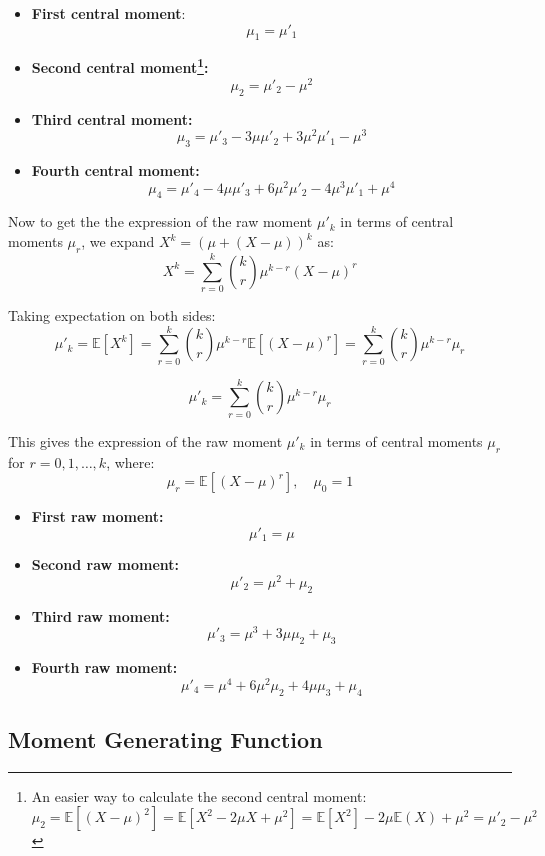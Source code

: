 \documentclass[twoside]{book}
\begin{document}
\begin{itemize}
\item \textbf{First central moment}:
$$\mu_1 = \mu'_1$$
  \item \textbf{Second central moment\footnote{An easier way to calculate the second central moment: \[
  \mu_2 = \mathbb{E}[(X - \mu)^2] 
  = \mathbb{E}[X^2 - 2\mu X + \mu^2]
  = \mathbb{E}[X^2] - 2\mu \mathbb{E}(X) + \mu^2
  = \mu'_2 - \mu^2
  \]}:}
  \[
  \mu_2 = \mu'_2 - \mu^2
  \]
  

  \item \textbf{Third central moment:}
  \[
  \mu_3 = \mu'_3 - 3\mu \mu'_2 + 3\mu^2 \mu'_1 - \mu^3
  \]

  \item \textbf{Fourth central moment:}
  \[
  \mu_4 = \mu'_4 - 4\mu \mu'_3 + 6\mu^2 \mu'_2 - 4\mu^3 \mu'_1 + \mu^4
  \]
\end{itemize}


Now to get the the expression of the raw moment \(\mu'_k\) in terms of central moments \(\mu_r\), we expand \(X^k = (\mu + (X - \mu))^k\) as:
\[
X^k = \sum_{r=0}^{k} \binom{k}{r} \mu^{k - r} (X - \mu)^r
\]

Taking expectation on both sides:
\[
\mu'_k = \mathbb{E}[X^k] = \sum_{r=0}^{k} \binom{k}{r} \mu^{k - r} \mathbb{E}[(X - \mu)^r]
= \sum_{r=0}^{k} \binom{k}{r} \mu^{k - r} \mu_r
\]
\begin{textbox}
    \[
\mu'_k = \sum_{r=0}^{k} \binom{k}{r} \mu^{k - r} \mu_r
\]
\end{textbox}

This gives the expression of the raw moment \(\mu'_k\) in terms of central moments \(\mu_r\) for \(r = 0, 1, \ldots, k\), where:
\[
\mu_r = \mathbb{E}[(X - \mu)^r], \quad \mu_0 = 1
\]

\begin{itemize}
  \item \textbf{First raw moment:}
  \[
  \mu'_1 = \mu
  \]

  \item \textbf{Second raw moment:}
  \[
  \mu'_2 = \mu^2 + \mu_2
  \]

  \item \textbf{Third raw moment:}
  \[
  \mu'_3 = \mu^3 + 3\mu \mu_2 + \mu_3
  \]

  \item \textbf{Fourth raw moment:}
  \[
  \mu'_4 = \mu^4 + 6\mu^2 \mu_2 + 4\mu \mu_3 + \mu_4
  \]
\end{itemize}

\subsection{Moment Generating Function}
\end{document}

